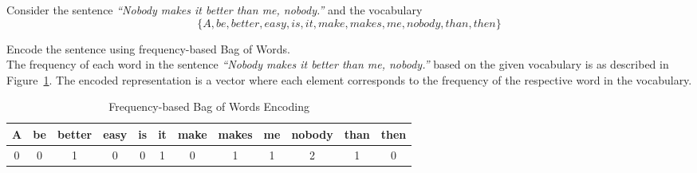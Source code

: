 \documentclass[12pt]{article}
\begin{document}
    \begin{ejercicio}
        Consider the sentence \textit{``Nobody makes it better than me, nobody.''} and the vocabulary
        $$\{A, be, better, easy, is, it, make, makes, me, nobody, than, then\}$$
        
        Encode the sentence using frequency-based Bag of Words.\\

        The frequency of each word in the sentence \textit{``Nobody makes it better than me, nobody.''} based on the given vocabulary is as described in Figure~\ref{fig:bow_encoding}. The encoded representation is a vector where each element corresponds to the frequency of the respective word in the vocabulary.
        \begin{table}[h!]
        \centering
        \begin{tabular}{|c|c|c|c|c|c|c|c|c|c|c|c|}
        \hline
        \textbf{A} & \textbf{be} & \textbf{better} & \textbf{easy} & \textbf{is} & \textbf{it} & \textbf{make} & \textbf{makes} & \textbf{me} & \textbf{nobody} & \textbf{than} & \textbf{then} \\ \hline
        0 & 0 & 1 & 0 & 0 & 1 & 0 & 1 & 1 & 2 & 1 & 0 \\ \hline
        \end{tabular}
        \caption{Frequency-based Bag of Words Encoding}
        \label{fig:bow_encoding}
        \end{table}
    \end{ejercicio}
\end{document}
